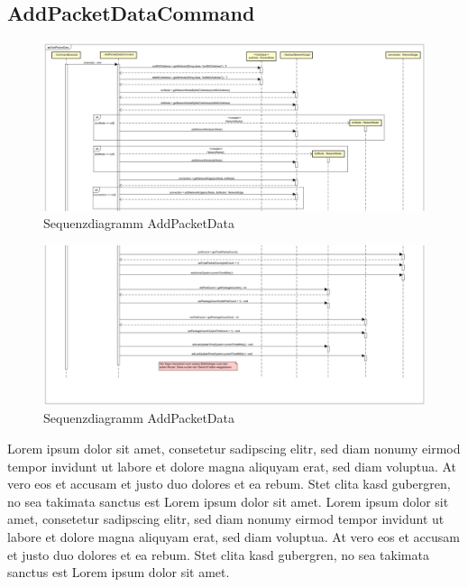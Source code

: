 \subsection{AddPacketDataCommand}
\begin{figure}
  \centering
  \includegraphics[width=\textwidth]{../diagramimages/sd_AddPacketData1.png}
  \caption[Sequenzdiagramm AddPacketData]{Sequenzdiagramm AddPacketData}
\end{figure}

\begin{figure}
  \centering
  \includegraphics[width=\textwidth]{../diagramimages/sd_AddPacketData2.png}
  \caption[Sequenzdiagramm AddPacketData]{Sequenzdiagramm AddPacketData}
\end{figure}

Lorem ipsum dolor sit amet, consetetur sadipscing elitr, sed diam nonumy eirmod tempor invidunt ut labore et dolore magna aliquyam erat, sed diam voluptua. At vero eos et accusam et justo duo dolores et ea rebum. Stet clita kasd gubergren, no sea takimata sanctus est Lorem ipsum dolor sit amet. Lorem ipsum dolor sit amet, consetetur sadipscing elitr, sed diam nonumy eirmod tempor invidunt ut labore et dolore magna aliquyam erat, sed diam voluptua. At vero eos et accusam et justo duo dolores et ea rebum. Stet clita kasd gubergren, no sea takimata sanctus est Lorem ipsum dolor sit amet.